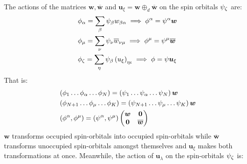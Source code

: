 \documentclass{aux/ttuthes2007}
\newcommand{\paren}[1]{\left( #1 \right)}
\newcommand{\elec}{N}
\newcommand{\orb}{K}
\newcommand{\uo}[1]{
		\IfEqCase{#1}{
			{0}{\mu}
			{1}{\nu}
			{2}{\xi}
		}[\PackageError{uo}{Undefined option to uo: #1}{}]
}
\newcommand{\oo}[1]{
		\IfEqCase{#1}{
			{0}{\alpha}
			{1}{\beta}
			{2}{\gamma}
		}[\PackageError{unocorb}{Undefined option to unuo: #1}{}]
}
\newcommand{\go}[1]{
		\IfEqCase{#1}{
			{0}{\zeta}
			{1}{\eta}
			{2}{\iota}
			{3}{\kappa}
		}[\PackageError{unocorb}{Undefined option to go: #1}{}]
}
\newcommand{\psiu}[1]{
	\psi_{\uo{#1}}
}
\newcommand{\psio}[1]{
	\psi_{\oo{#1}}
}
\newcommand{\psig}[1]{
	\psi_{\go{#1}}
}
\begin{document}
The actions of the matrices $\bm w, \overline{\bm w}$ and $\bm u_\xi = \bm w \oplus_d \overline{\bm w}$ on the spin orbitals $\psig 0$ are:
\begin{equation*}
\begin{split}
	&\phi_{\oo 0} = 
	\sum_{\oo 1}\psio 1 w_{\oo 1 \oo 0} \implies \phi^{\oo 0} = \psi^{\oo 0} \bm w \\
	&\phi_{\uo 0} = 
	\sum_{\uo 1}\psiu 1 \overline w_{\uo 1 \uo 0} \implies \phi^{\uo 0} = \psi^{\uo 0} \overline{\bm w} \\
	&\phi_{\go 0} = 
	\sum_{\go 1}\psio 1 \paren{u_\xi}_{\go 1 \go 2} \implies \phi = \psi \bm u_{\xi} 
\end{split}
\end{equation*}
That is:
\begin{equation*}
\begin{split}
	&\paren{\phi_1 \ldots \phi_{\oo 0} \ldots \phi_\elec}
	= \paren{\psi_1 \ldots \psi_{\oo 0} \ldots \psi_\elec} \bm w\\
	&\paren{\phi_{N + 1} \ldots \phi_{\uo 0} \ldots \phi_\orb}
	= \paren{\psi_{N +1} \ldots \psi_{\uo 0} \ldots \psi_\orb} \bm w\\
	&\paren{\phi^{\oo 0}, \phi^{\uo 0}}
	= \paren{\psi^{\oo 0}, \psi^{\uo 0}}
	\begin{pmatrix}\bm w & \bm 0 \\ \bm 0 & \overline {\bm w} \end{pmatrix} 
\end{split}
\end{equation*}
$\bm w$ transforms occupied spin-orbitals into occupied spin-orbitals while $\overline{\bm w}$ transforms unoccupied spin-orbitals amongst themselves and $\bm u_\xi$ makes both transformations at once.
Meanwhile, the action of $\bm u_\lambda$ on the spin-orbitals $\psi_{\go 0}$ is:
\end{document}
